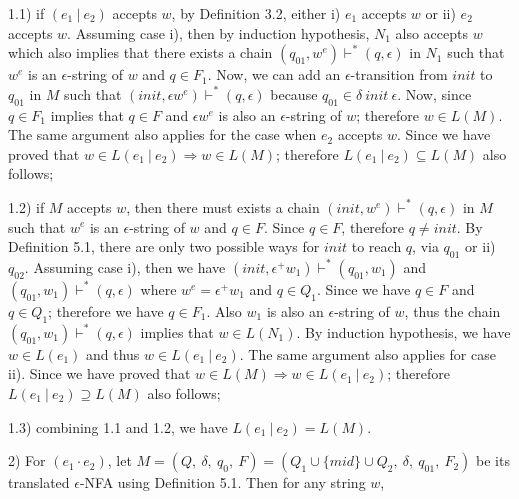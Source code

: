 \documentclass[twoside,openright,final]{bhamthesis}
\begin{document}
\par 1.1) if \((e_1\ |\ e_2)\) accepts \(w\), by Definition 3.2,
either i) \(e_1\) accepts \(w\) or ii) \(e_2\) accepts \(w\). Assuming case i), then by
induction hypothesis, \(N_1\) also accepts \(w\) which also implies
that there exists a chain \((q_{01} , w^e) \vdash^* (q , \epsilon)\) in \(N_1\) such that
\(w^e\) is an \(\epsilon\)-string of \(w\) and \(q \in F_1\). Now, we can
add an \(\epsilon\)-transition from \(init\) to \(q_{01}\) in \(M\)
such that \((init , \epsilon w^e) \vdash^* (q , \epsilon)\)
because \(q_{01} \in \delta\ init\ \epsilon\). Now, since \(q \in
F_1\) implies that \(q \in F\) and \(\epsilon w^e\)
is also an \(\epsilon\)-string of \(w\); therefore \(w \in L(M)\). The same argument also applies
for the case when \(e_2\) accepts \(w\). Since we have proved that \(w \in L(e_1\ |\ e_2)
\Rightarrow w \in L(M)\); therefore \(L(e_1\ |\ e_2) \subseteq L(M)\)
also follows;

\par 1.2) if \(M\) accepts \(w\), then there must exists a chain \((init , w^e) \vdash^* (q ,
\epsilon)\) in \(M\) such that \(w^e\) is an \(\epsilon\)-string of \(w\) and \(q
\in F\). Since \(q \in F\), therefore \(q \neq init\). By Definition
5.1, there are only two possible ways for \(init\) to reach \(q\), via \(q_{01}\) or ii) 
\(q_{02}\). Assuming case i), then we have \((init , \epsilon^+w_1) \vdash^*
(q_{01} , w_1)\) and \((q_{01} , w_1) \vdash^* (q , \epsilon)\) where \(w^e =
\epsilon^+w_1\) and \(q \in Q_1\). Since we have \(q \in F\) and \(q \in
Q_1\); therefore we have \(q \in F_1\). Also \(w_1\) is also an
\(\epsilon\)-string of \(w\), thus the chain \((q_{01} , w_1) \vdash^* (q , \epsilon)\)
implies that \(w \in L(N_1)\). By induction hypothesis, we have \(w \in L(e_1)\) and thus \(w \in L(e_1\
|\ e_2)\). The same argument also applies for case ii). Since we have
proved that \(w \in
L(M) \Rightarrow w \in L(e_1\ |\ e_2)\); therefore \(L(e_1\ |\ e_2)
\supseteq L(M)\) also follows;

\par 1.3) combining 1.1  and 1.2, we have \(L(e_1\ |\ e_2) = L(M)\). 
\\
\par 2) For \((e_1 \cdot e_2)\), let \(M = (Q,\ \delta,\ q_0,\ F) = (Q_1 \cup \{mid\} \cup Q_2,\ \delta,\ q_{01},\ F_2)\) be its
translated \(\epsilon\)-NFA using Definition 5.1. Then for any string
\(w\), 
\end{document}
